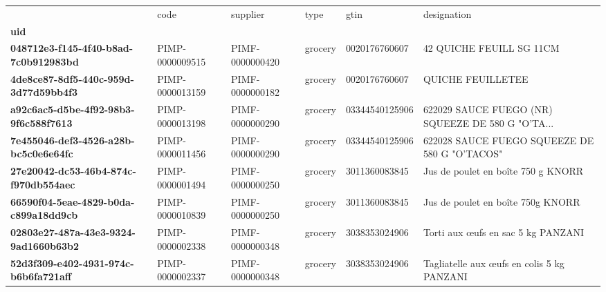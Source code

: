 \begin{table}
\centering
\label{tab:dup_gtin}
\begin{tabularx}{\linewidth}{lXXXXX}
\toprule
{} &             code &         supplier &     type &            gtin &                                        designation \\
\textbf{uid                                 } &                  &                  &          &                 &                                                    \\
\midrule
\textbf{048712e3-f145-4f40-b8ad-7c0b912983bd} &  PIMP-0000009515 &  PIMF-0000000420 &  grocery &   0020176760607 &                           42 QUICHE FEUILL SG 11CM \\
\textbf{4de8ce87-8df5-440c-959d-3d77d59bb4f3} &  PIMP-0000013159 &  PIMF-0000000182 &  grocery &   0020176760607 &                                  QUICHE FEUILLETEE \\
\textbf{a92c6ac5-d5be-4f92-98b3-9f6c588f7613} &  PIMP-0000013198 &  PIMF-0000000290 &  grocery &  03344540125906 &  622029 SAUCE FUEGO (NR) SQUEEZE DE 580 G "O'TA... \\
\textbf{7e455046-def3-4526-a28b-bc5c0e6e64fc} &  PIMP-0000011456 &  PIMF-0000000290 &  grocery &  03344540125906 &      622028 SAUCE FUEGO SQUEEZE DE 580 G "O'TACOS" \\
\textbf{27e20042-dc53-46b4-874c-f970db554aec} &  PIMP-0000001494 &  PIMF-0000000250 &  grocery &   3011360083845 &                 Jus de poulet en boîte 750 g KNORR \\
\textbf{66590f04-5eae-4829-b0da-c899a18dd9cb} &  PIMP-0000010839 &  PIMF-0000000250 &  grocery &   3011360083845 &                  Jus de poulet en boîte 750g KNORR \\
\textbf{02803e27-487a-43e3-9324-9ad1660b63b2} &  PIMP-0000002338 &  PIMF-0000000348 &  grocery &   3038353024906 &                 Torti aux œufs en sac 5 kg PANZANI \\
\textbf{52d3f309-e402-4931-974c-b6b6fa721aff} &  PIMP-0000002337 &  PIMF-0000000348 &  grocery &   3038353024906 &         Tagliatelle aux œufs en colis 5 kg PANZANI \\
\bottomrule
\end{tabularx}
\end{table}

